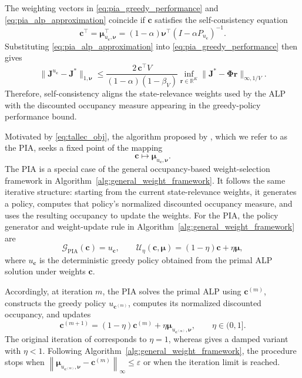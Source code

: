 \documentclass[sglanonrev]{informs4}
\providecommand{\bJ}{\boldsymbol{J}}
\providecommand{\bPhi}{\boldsymbol{\Phi}}
\providecommand{\bc}{\boldsymbol{c}}
\providecommand{\bmu}{\boldsymbol{\mu}}
\providecommand{\bnu}{\boldsymbol{\nu}}
\providecommand{\br}{\boldsymbol{r}}
\begin{document}
\begin{APPENDICES}
The weighting vectors in \eqref{eq:pia_greedy_performance} and \eqref{eq:pia_alp_approximation} coincide if $\bc$ satisfies the self-consistency equation
\begin{equation}
\label{eq:tallec_obj}
\bc^\top
=
\bmu_{u_{\bc},\bnu}^{\top}
=
(1-\alpha)\bnu^\top
\left(I-\alpha P_{u_{\bc}}\right)^{-1}.
\end{equation}
Substituting \eqref{eq:pia_alp_approximation} into \eqref{eq:pia_greedy_performance} then gives
\begin{equation}
\label{eq:tallec_bound}
\|\bJ^{u_{\bc}}-\bJ^*\|_{1,\bnu}
\leq
\frac{2\,\bc^\top V}
{(1-\alpha)(1-\beta_V)}
\inf_{\br\in\mathbb R^K}
\|\bJ^*-\bPhi\br\|_{\infty,1/V}.
\end{equation}
Therefore, self-consistency aligns the state-relevance weights used by the \ac{ALP} with the discounted occupancy measure appearing in the greedy-policy performance bound.

Motivated by \eqref{eq:tallec_obj}, the algorithm proposed by \citet{le2004choose}, which we refer to as the \ac{PIA}, seeks a fixed point of the mapping
\[
\bc
\longmapsto
\bmu_{u_{\bc},\bnu}.
\]
The \ac{PIA} is a special case of the general occupancy-based weight-selection framework in Algorithm~\ref{alg:general_weight_framework}. It follows the same
iterative structure: starting from the current state-relevance weights, it generates a policy, computes that policy's normalized discounted
occupancy measure, and uses the resulting occupancy to update the weights. For the \ac{PIA}, the policy generator and weight-update rule
in Algorithm~\ref{alg:general_weight_framework} are
\[
\mathcal G_{\mathrm{PIA}}(\bc)=u_{\bc},
\qquad
\mathcal U_{\eta}(\bc,\bmu)
=
(1-\eta)\bc+\eta\bmu,
\]
where $u_{\bc}$ is the deterministic greedy policy obtained from the
primal \ac{ALP} solution under weights $\bc$.

Accordingly, at iteration $m$, the \ac{PIA} solves the primal \ac{ALP} using $\bc^{(m)}$, constructs the greedy policy $u_{\bc^{(m)}}$, computes its normalized discounted occupancy, and updates 
\begin{equation}
\label{eq:pia_update}
\bc^{(m+1)}
=
(1-\eta)\bc^{(m)}
+
\eta\bmu_{u_{\bc^{(m)}},\bnu},
\qquad
\eta\in(0,1].
\end{equation}
The original iteration of \cite{le2004choose} corresponds to $\eta=1$, whereas \cite{de2008choosing} gives a damped variant with $\eta<1$. Following Algorithm~\ref{alg:general_weight_framework}, the procedure stops when 
$
\left\|
\bmu_{u_{\bc^{(m)}},\bnu}-\bc^{(m)}
\right\|_{\infty}
\leq\varepsilon
$
or when the iteration limit is reached.


\end{APPENDICES}
\end{document}
